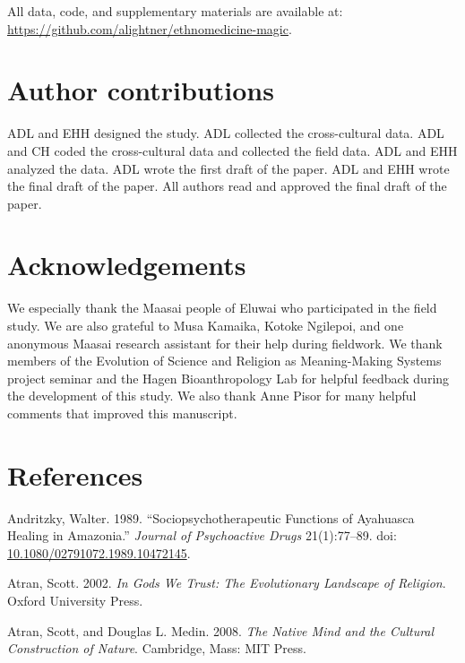 \documentclass[
  11pt,
]{article}
\begin{document}
All data, code, and supplementary materials are available at: \url{https://github.com/alightner/ethnomedicine-magic}.

\hypertarget{author-contributions}{%
\section{Author contributions}\label{author-contributions}}

ADL and EHH designed the study. ADL collected the cross-cultural data. ADL and CH coded the cross-cultural data and collected the field data. ADL and EHH analyzed the data. ADL wrote the first draft of the paper. ADL and EHH wrote the final draft of the paper. All authors read and approved the final draft of the paper.

\hypertarget{acknowledgements}{%
\section{Acknowledgements}\label{acknowledgements}}

We especially thank the Maasai people of Eluwai who participated in the field study. We are also grateful to Musa Kamaika, Kotoke Ngilepoi, and one anonymous Maasai research assistant for their help during fieldwork. We thank members of the Evolution of Science and Religion as Meaning-Making Systems project seminar and the Hagen Bioanthropology Lab for helpful feedback during the development of this study. We also thank Anne Pisor for many helpful comments that improved this manuscript.

\hypertarget{references}{%
\section*{References}\label{references}}

\hypertarget{refs}{}
\leavevmode\hypertarget{ref-andritzkySociopsychotherapeuticFunctionsAyahuasca1989}{}%
Andritzky, Walter. 1989. ``Sociopsychotherapeutic Functions of Ayahuasca Healing in Amazonia.'' \emph{Journal of Psychoactive Drugs} 21(1):77--89. doi: \href{https://doi.org/10.1080/02791072.1989.10472145}{10.1080/02791072.1989.10472145}.

\leavevmode\hypertarget{ref-atran2002gods}{}%
Atran, Scott. 2002. \emph{In Gods We Trust: The Evolutionary Landscape of Religion}. Oxford University Press.

\leavevmode\hypertarget{ref-atranNativeMindCultural2008}{}%
Atran, Scott, and Douglas L. Medin. 2008. \emph{The Native Mind and the Cultural Construction of Nature}. Cambridge, Mass: MIT Press.
\end{document}
